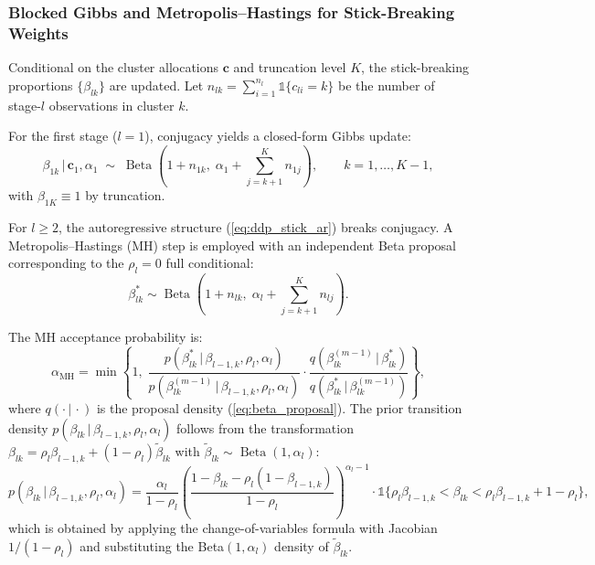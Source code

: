 \documentclass[a4paper,fleqn,longmktitle]{cas-sc}
\DeclareMathOperator{\Be}{Beta}
\newcommand{\given}{\,|\,}
\begin{document}
\subsubsection{Blocked Gibbs and Metropolis--Hastings for Stick-Breaking Weights}

Conditional on the cluster allocations $\bm{c}$ and truncation level $K$, the stick-breaking proportions $\{\beta_{lk}\}$ are updated. Let $n_{lk} = \sum_{i=1}^{n_l} \mathbb{1}\{c_{li} = k\}$ be the number of stage-$l$ observations in cluster $k$.

For the first stage ($l = 1$), conjugacy yields a closed-form Gibbs update:
\begin{equation}\label{eq:beta1}
    \beta_{1k} \given \bm{c}_1, \alpha_1 \;\sim\;
    \Be\!\left(1 + n_{1k}, \; \alpha_1 + \sum_{j=k+1}^{K} n_{1j}\right),
    \qquad k = 1, \ldots, K-1,
\end{equation}
with $\beta_{1K} \equiv 1$ by truncation.

For $l \geq 2$, the autoregressive structure (\ref{eq:ddp_stick_ar}) breaks conjugacy. A Metropolis--Hastings (MH) step is employed with an independent Beta proposal corresponding to the $\rho_l = 0$ full conditional:
\begin{equation}\label{eq:beta_proposal}
    \beta_{lk}^* \sim \Be\!\left(1 + n_{lk}, \; \alpha_l + \sum_{j=k+1}^{K} n_{lj}\right).
\end{equation}

The MH acceptance probability is:
\begin{equation}\label{eq:mh_beta}
    \alpha_{\text{MH}} = \min\!\left\{1, \;
        \frac{p(\beta_{lk}^* \given \beta_{l-1,k}, \rho_l, \alpha_l)}
             {p(\beta_{lk}^{(m-1)} \given \beta_{l-1,k}, \rho_l, \alpha_l)}
        \cdot
        \frac{q(\beta_{lk}^{(m-1)} \given \beta_{lk}^*)}
             {q(\beta_{lk}^* \given \beta_{lk}^{(m-1)})}
    \right\},
\end{equation}
where $q(\cdot \given \cdot)$ is the proposal density (\ref{eq:beta_proposal}). The prior transition density $p(\beta_{lk} \given \beta_{l-1,k}, \rho_l, \alpha_l)$ follows from the transformation $\beta_{lk} = \rho_l \beta_{l-1,k} + (1 - \rho_l) \tilde{\beta}_{lk}$ with $\tilde{\beta}_{lk} \sim \Be(1, \alpha_l)$:
\begin{equation}\label{eq:beta_transition}
    p(\beta_{lk} \given \beta_{l-1,k}, \rho_l, \alpha_l) =
    \frac{\alpha_l}{1 - \rho_l}
    \left(\frac{1 - \beta_{lk} - \rho_l(1 - \beta_{l-1,k})}{1 - \rho_l}\right)^{\alpha_l - 1}
    \cdot \mathbb{1}\{\rho_l\beta_{l-1,k} < \beta_{lk} < \rho_l\beta_{l-1,k} + 1 - \rho_l\},
\end{equation}
which is obtained by applying the change-of-variables formula with Jacobian $1/(1-\rho_l)$ and substituting the Beta$(1,\alpha_l)$ density of $\tilde{\beta}_{lk}$.
\end{document}
